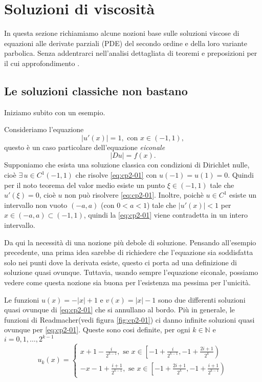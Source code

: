 \chapter{Soluzioni di viscosità}
In questa sezione richiamiamo alcune nozioni base sulle soluzioni viscose di equazioni alle derivate parziali (PDE) del secondo ordine e della loro variante parbolica. Senza addentrarci nell'analisi dettagliata di teoremi e preposizioni per il cui approfondimento \cite[vedi][]{fed:drag,giga:main,crand:lion,yun:giga}.
%
%
%
\section{Le soluzioni classiche non bastano}
Iniziamo subito con un esempio.
\begin{esempio}
Consideriamo l'equazione
\begin{equation}
\label{eq:cp2-01}
|u'(x)| = 1,\text{ con $x\in(-1,1)$},
\end{equation}
questo è un caso particolare dell'equazione \emph{eiconale}
\[
|Du| = f(x).
\]
Supponiamo che esista una soluzione classica con condizioni di Dirichlet nulle, cioè $\exists\, u\in C^1(-1,1)$ che risolve \eqref{eq:cp2-01} con $u(-1)=u(1)=0$. Quindi per il noto teorema del valor medio esiste un punto $\xi\in (-1,1)$ tale che $u'(\xi)=0$, cioè $u$ non può risolvere \eqref{eq:cp2-01}. Inoltre, poichè $u\in C^1$ esiste un intervallo non vuoto $(-a,a)$ (con $0<a<1$) tale che $|u'(x)|<1$ per $x\in(-a,a)\subset(-1,1)$, quindi la \eqref{eq:cp2-01} viene contradetta in un intero intervallo.
\end{esempio}
Da qui la necessità di una nozione più debole di soluzione. Pensando all'esempio precedente, una prima idea sarebbe di richiedere che l'equazione sia soddisfatta solo nei punti dove la derivata esiste, questo ci porta ad una definizione di soluzione quasi ovunque. Tuttavia, usando sempre l'equazione eiconale, possiamo vedere come questa nozione sia buona per l'esistenza ma pessima per l'unicità.
\begin{esempio}
Le funzioni $u(x)=-|x|+1$ e $v(x)=|x|-1$ sono due differenti soluzioni quasi ovunque di \eqref{eq:cp2-01} che si annullano al bordo. Più in generale, le funzioni di Readmacher(vedi figura \ref{fig:cp2-01}) ci danno infinite soluzioni quasi ovunque per \eqref{eq:cp2-01}.
Queste sono cosi definite, per ogni $k\in \mathbb{N}$ e $i=0,1,\dots,2^{k-1}$
\[
u_k(x)=
\begin{cases}
  x+1-\frac{i}{2^{k-1}},\text{ se }x\in\left[-1+\frac{i}{2^{k-1}},-1+\frac{2i+1}{2^k}\right) \\
  -x-1 +\frac{i+1}{2^{k-1}},\text{ se }x\in\left[-1+\frac{2i+1}{2^k},-1+\frac{i+1}{2^{k-1}}\right)
\end{cases}
\]
\end{esempio}
